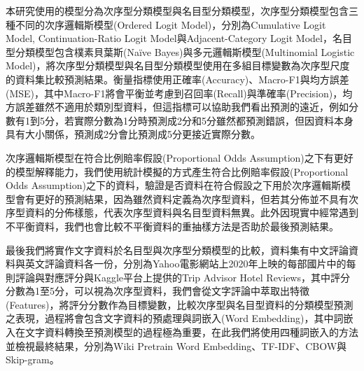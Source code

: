 	本研究使用的模型分為次序型分類模型與名目型分類模型，次序型分類模型包含三種不同的次序邏輯斯模型(Ordered Logit Model)，分別為Cumulative Logit Model, Continuation-Ratio Logit Model與Adjacent-Category Logit Model，名目型分類模型包含樸素貝葉斯(Naïve Bayes)與多元邏輯斯模型(Multinomial Logistic Model)，將次序型分類模型與名目型分類模型使用在多組目標變數為次序型尺度的資料集比較預測結果。衡量指標使用正確率(Accuracy)、Macro-F1與均方誤差(MSE)，其中Macro-F1將會平衡並考慮到召回率(Recall)與準確率(Precision)，均方誤差雖然不適用於類別型資料，但這指標可以協助我們看出預測的遠近，例如分數有1到5分，若實際分數為1分時預測成2分和5分雖然都預測錯誤，但因資料本身具有大小關係，預測成2分會比預測成5分更接近實際分數。
	
	次序邏輯斯模型在符合比例賠率假設(Proportional Odds Assumption)之下有更好的模型解釋能力，我們使用統計模擬的方式產生符合比例賠率假設(Proportional Odds Assumption)之下的資料，驗證是否資料在符合假設之下用於次序邏輯斯模型會有更好的預測結果，因為雖然資料定義為次序型資料，但若其分佈並不具有次序型資料的分佈樣態，代表次序型資料與名目型資料無異。此外因現實中經常遇到不平衡資料，我們也會比較不平衡資料的重抽樣方法是否助於最後預測結果。
	
	最後我們將實作文字資料於名目型與次序型分類模型的比較，資料集有中文評論資料與英文評論資料各一份，分別為Yahoo電影網站上2020年上映的每部國片中的每則評論與對應評分與Kaggle平台上提供的Trip Advisor Hotel Reviews，其中評分分數為1至5分，可以視為次序型資料，我們會從文字評論中萃取出特徵(Features)，將評分分數作為目標變數，比較次序型與名目型資料的分類模型預測之表現，過程將會包含文字資料的預處理與詞嵌入(Word Embedding)，其中詞嵌入在文字資料轉換至預測模型的過程極為重要，在此我們將使用四種詞嵌入的方法並檢視最終結果，分別為Wiki Pretrain Word Embedding、TF-IDF、CBOW與Skip-gram。

\newpage

